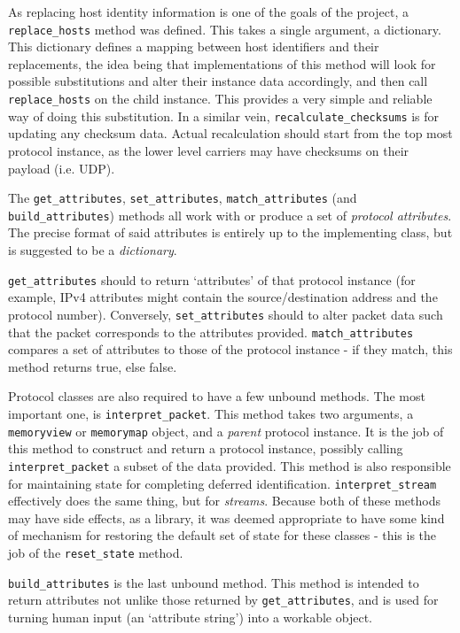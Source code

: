 \documentclass[10pt,a4paper,notitlepage]{report}
\begin{document}
As replacing host identity information is one of the goals of the project, a \texttt{replace_hosts} method was defined. This takes a single argument, a dictionary. This dictionary defines a mapping between host identifiers and their replacements, the idea being that implementations of this method will look for possible substitutions and alter their instance data accordingly, and then call \texttt{replace_hosts} on the child instance. This provides a very simple and reliable way of doing this substitution. In a similar vein, \texttt{recalculate_checksums} is for updating any checksum data. Actual recalculation should start from the top most protocol instance, as the lower level carriers may have checksums on their payload (i.e. UDP).

The \texttt{get_attributes}, \texttt{set_attributes}, \texttt{match_attributes} (and \texttt{build_attributes})  methods all work with or produce  a set of \emph{protocol attributes}. The precise format of said attributes is entirely up to the implementing class, but is suggested to be a \emph{dictionary}.

\texttt{get_attributes} should to return `attributes' of that protocol instance (for example, IPv4 attributes might contain the source/destination address and the protocol number). Conversely, \texttt{set_attributes} should to alter packet data such that the packet corresponds to the attributes provided. \texttt{match_attributes} compares a set of attributes to those of the protocol instance - if they match, this method returns true, else false.

Protocol classes are also required to have a few unbound methods. The most important one, is \texttt{interpret_packet}. 
This method takes two arguments, a \texttt{memoryview} or \texttt{memorymap} object, and a \emph{parent} protocol instance. It is the job of this method to construct and return a protocol instance, possibly calling \texttt{interpret_packet} a subset of the data provided. This method is also responsible for maintaining state for completing deferred identification. \texttt{interpret_stream} effectively does the same thing, but for \emph{streams}.
Because both of these methods may have side effects, as a library, it was deemed appropriate to have some kind of mechanism for restoring the default set of state for these classes - this is the job of the \texttt{reset_state} method.

\texttt{build_attributes} is the last unbound method. This method is intended to return attributes not unlike those returned by \texttt{get_attributes}, and is used for turning human input (an `attribute string') into a workable object.
\end{document}
